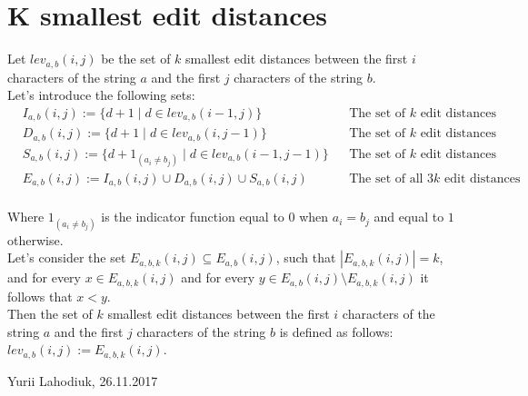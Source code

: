 \documentclass[fleqn,leqno]{article}
\begin{document}
\setlength{\parindent}{0pt}

\section*{K smallest edit distances}

Let $lev_{a,b}(i, j)$ be the set of $k$ smallest edit distances between the first $i$ characters of the string $a$ and the first $j$ characters of the string $b$. \\

Let's introduce the following sets:
\begin{equation*}
\begin{split}
	      & I_{a,b}(i, j) := \{ d + 1 \mid d \in lev_{a,b}(i - 1, j) \}  && \text{The set of $k$ edit distances obtained through insertions} \\
	      & D_{a,b}(i, j) := \{ d + 1 \mid d \in lev_{a,b}(i, j - 1) \} && \text{The set of $k$ edit distances obtained through deletions} \\
	      & S_{a,b}(i, j) := \{ d + 1_{(a_i \neq b_j)} \mid d \in lev_{a,b}(i - 1, j - 1) \} && \text{The set of $k$ edit distances obtained through substitutions} \\ 
	      & E_{a,b}(i, j) := I_{a,b}(i, j) \cup D_{a,b}(i, j) \cup S_{a,b}(i, j) && \text{The set of all $3k$ edit distances}  \\
\end{split}
\end{equation*}

Where $1_{(a_i \neq b_j)}$ is the indicator function equal to $0$ when $a_{i}=b_{j}$ and equal to $1$ otherwise. \\

Let's consider the set $E_{a,b,k}(i, j) \subseteq E_{a,b}(i, j)$, such that $|E_{a,b,k}(i, j)| = k$, and for every $x \in E_{a,b,k}(i, j)$ and for every $y \in E_{a,b}(i, j) \setminus E_{a,b,k}(i, j)$ it follows that $x < y$. \\

Then the set of $k$ smallest edit distances between the first $i$ characters of the string $a$ and the first $j$ characters of the string $b$ is defined as follows: $lev_{a,b}(i, j) := E_{a,b,k}(i, j)$.

\hfill Yurii Lahodiuk, 26.11.2017
\end{document}
